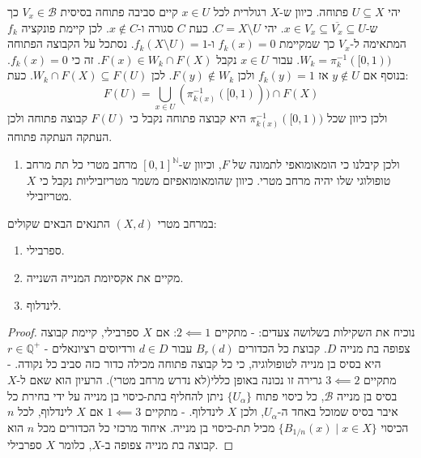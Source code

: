 \documentclass{tstextbook}
\begin{document}
יהי \(U\subseteq X\) פתוחה. כיוון ש-\(X\) רגולרית לכל \(x \in U\) קיים סביבה פתוחה בסיסית \(V_{x}\in \mathcal{B}\) כך ש-\(x \in V_x \subseteq \overline{V_x} \subseteq U\). יהי \(C = X \setminus U\). כעת \(C\) סגורה ו-\(x \not \in C\). לכן קיימת פונקציה \(f_{k}\) המתאימה ל-\(V_{x}\) כך שמקיימת \(f_{k}(x)=0\) ו-\(f_{k}\left( X\setminus U \right)=1\). נסתכל על הקבוצה הפתוחה \(W_k = \pi_k^{-1}([0, 1))\). עבור \(x \in U\) נקבל \(F(x)\in W_{k}\cap F(X)\). זה כי \(f_{k}(x)=0\). בנוסף אם \(y \not \in U\) אז \(f_{k}(y)=1\) ולכן \(F(y)\not \in W_{k}\). לכן \(W_{k}\cap F(X)\subseteq F(U)\). כעת:
$$F(U) = \bigcup_{x \in U} (\pi_{k(x)}^{-1}([0, 1))) \cap F(X)$$
ולכן כיוון שכל \(\pi_{k(x)}^{-1}([0, 1))\) היא קבוצה פתוחה נקבל כי \(F(U)\) קבוצה פתוחה ולכן העתקה העתקה פתוחה.

\begin{enumerate}
  \item ולכן קיבלנו כי הומאומואפי לתמונה של \(F\), וכיוון ש-\([0,1]^{\mathbb{N}}\) מרחב מטרי כל תת מרחב טופולוגי שלו יהיה מרחב מטרי. כיוון שהומאומואפיזם משמר מטריזביליות נקבל כי \(X\) מטריזבילי. 
\end{enumerate}
\begin{proposition}
במרחב מטרי \((X,d)\) התנאים הבאים שקולים:

  \begin{enumerate}
    \item ספרבילי. 


    \item מקיים את אקסיומת המנייה השנייה. 


    \item לינדלוף. 


  \end{enumerate}
\end{proposition}
\begin{proof}
נוכיח את השקילות בשלושה צעדים:
- מתקיים \(2\impliedby 1\): אם \(X\) ספרבילי, קיימת קבוצה צפופה בת מנייה \(D\). קבוצת כל הכדורים \(B_r(d)\) עבור \(d \in D\) ורדיוסים רציונאלים - \(r \in \mathbb{Q}^+\) היא בסיס בן מנייה לטופולוגיה, כי כל קבוצה פתוחה מכילה כדור כזה סביב כל נקודה.
- מתקיים \(3\impliedby 2\)  גרירה זו נכונה באופן כללי(לא נדרש מרחב מטרי). הרעיון הוא שאם ל-\(X\) בסיס בן מנייה \(\mathcal{B}\), כל כיסוי פתוח \(\{U_\alpha\}\) ניתן להחליף בתת-כיסוי בן מנייה על ידי בחירת כל איבר בסיס שמוכל באחד ה-\(U_\alpha\), ולכן \(X\) לינדלוף.
- מתקיים \(1\impliedby 3\) אם \(X\) לינדלוף, לכל \(n\) הכיסוי \(\{B_{1/n}(x)\mid x\in X\}\) מכיל תת-כיסוי בן מנייה. איחוד מרכזי כל הכדורים מכל \(n\) הוא קבוצה בת מנייה צפופה ב-\(X\), כלומר \(X\) ספרבילי.

\end{proof}
\end{document}
